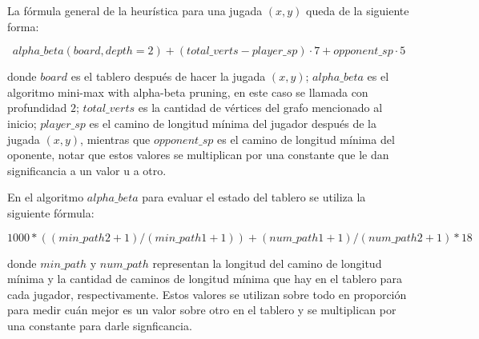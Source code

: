 \documentclass[11pt]{article}
\begin{document}
La fórmula general de la heurística para una jugada $(x, y)$ queda de la siguiente forma:

$$alpha\_beta(board, depth=2) + (total\_verts - player\_sp) \cdot 7 + opponent\_sp \cdot 5$$

donde $board$ es el tablero después de hacer la jugada $(x, y)$; $alpha\_beta$ es el algoritmo mini-max with alpha-beta pruning, en este caso se llamada con profundidad $2$; $total\_verts$ es la cantidad de vértices del grafo mencionado al inicio; $player\_sp$ es el camino de longitud mínima del jugador después de la jugada $(x, y)$, mientras que $opponent\_sp$ es el camino de longitud mínima del oponente, notar que estos valores se multiplican por una constante que le dan significancia a un valor u a otro. 

En el algoritmo $alpha\_beta$ para evaluar el estado del tablero se utiliza la siguiente fórmula:

$$1000 * ((min\_path2 + 1) / (min\_path1 + 1)) + (num\_path1 + 1) / (num\_path2 + 1) * 18$$

donde $min\_path$ y $num\_path$ representan la longitud del camino de longitud mínima y la cantidad de caminos de longitud mínima que hay en el tablero para cada jugador, respectivamente. Estos valores se utilizan sobre todo en proporción para medir cuán mejor es un valor sobre otro en el tablero y se multiplican por una constante para darle signficancia.
\end{document}
